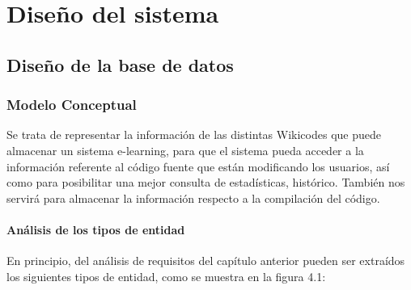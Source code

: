 \chapter[Diseño del sistema]{\label{}
Diseño del sistema}

\section{Diseño de la base de datos}

\subsection{Modelo Conceptual}

Se trata de representar la información de las distintas Wikicodes que puede almacenar un sistema e-learning, para que el sistema pueda acceder a la información referente al código fuente que están modificando los usuarios, así como para posibilitar una mejor consulta de estadísticas, histórico. También nos servirá para almacenar la información respecto a la compilación del código.

\subsubsection{Análisis de los tipos de entidad}

En principio, del análisis de requisitos del capítulo anterior pueden ser extraídos los siguientes tipos de entidad, como se muestra en la figura 4.1:

